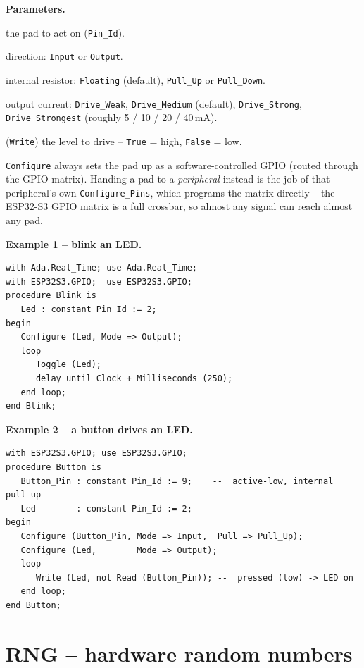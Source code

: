 \textbf{Parameters.}
\begin{description}[style=nextline]
\item[\texttt{Pin}] the pad to act on (\texttt{Pin\_Id}).
\item[\texttt{Mode}] direction: \texttt{Input} or \texttt{Output}.
\item[\texttt{Pull}] internal resistor: \texttt{Floating} (default), \texttt{Pull\_Up}
  or \texttt{Pull\_Down}.
\item[\texttt{Drive}] output current: \texttt{Drive\_Weak}, \texttt{Drive\_Medium}
  (default), \texttt{Drive\_Strong}, \texttt{Drive\_Strongest} (roughly
  5 / 10 / 20 / 40\,mA).
\item[\texttt{On}] (\texttt{Write}) the level to drive -- \texttt{True} = high,
  \texttt{False} = low.
\end{description}

\texttt{Configure} always sets the pad up as a software-controlled GPIO (routed
through the GPIO matrix). Handing a pad to a \emph{peripheral} instead is the job
of that peripheral's own \texttt{Configure\_Pins}, which programs the matrix
directly -- the ESP32-S3 GPIO matrix is a full crossbar, so almost any signal
can reach almost any pad.

\textbf{Example 1 -- blink an LED.}
\begin{lstlisting}
with Ada.Real_Time; use Ada.Real_Time;
with ESP32S3.GPIO;  use ESP32S3.GPIO;
procedure Blink is
   Led : constant Pin_Id := 2;
begin
   Configure (Led, Mode => Output);
   loop
      Toggle (Led);
      delay until Clock + Milliseconds (250);
   end loop;
end Blink;
\end{lstlisting}

\textbf{Example 2 -- a button drives an LED.}
\begin{lstlisting}
with ESP32S3.GPIO; use ESP32S3.GPIO;
procedure Button is
   Button_Pin : constant Pin_Id := 9;    --  active-low, internal pull-up
   Led        : constant Pin_Id := 2;
begin
   Configure (Button_Pin, Mode => Input,  Pull => Pull_Up);
   Configure (Led,        Mode => Output);
   loop
      Write (Led, not Read (Button_Pin)); --  pressed (low) -> LED on
   end loop;
end Button;
\end{lstlisting}

\section{RNG -- hardware random numbers}

